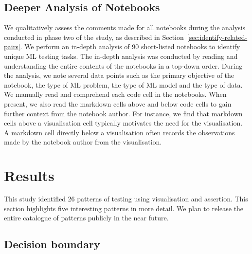 \documentclass[acmsmall,screen,review,anonymous]{acmart}
\begin{document}
\subsection{Deeper Analysis of Notebooks}\label{sec:deep-dive}

We qualitatively assess the comments made for all notebooks during the analysis conducted in phase two of the study, as described in Section~\ref{sec:identify-related-pairs}. We perform an in-depth analysis of 90 short-listed notebooks to identify unique ML testing tasks. The in-depth analysis was conducted by reading and understanding the entire contents of the notebooks in a top-down order. During the analysis, we note several data points such as the primary objective of the notebook, the type of ML problem, the type of ML model and the type of data. We manually read and comprehend each code cell in the notebooks. When present, we also read the markdown cells above and below code cells to gain further context from the notebook author. For instance, we find that markdown cells above a visualisation cell typically motivates the need for the visualisation. A markdown cell directly below a visualisation often records the observations made by the notebook author from the visualisation.

\section{Results}\label{sec:result}




This study identified 26 patterns of testing using visualisation and assertion. This section highlights five interesting patterns in more detail. We plan to release the entire catalogue of patterns publicly in the near future.


\subsection{Decision boundary}\label{sec:svm}


\end{document}
